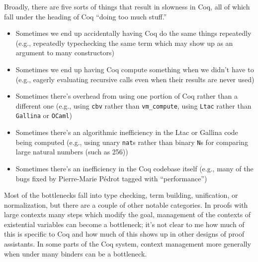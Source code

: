 \documentclass{article}
\begin{document}
Broadly, there are five sorts of things that result in slowness in Coq, all of which fall under the heading of Coq ``doing too much stuff.''
\begin{itemize}
\item
  Sometimes we end up accidentally having Coq do the same things repeatedly (e.g., repeatedly typechecking the same term which may show up as an argument to many constructors)
\item
  Sometimes we end up having Coq compute something when we didn't have to (e.g., eagerly evaluating recursive calls even when their results are never used)
\item
  Sometimes there's overhead from using one portion of Coq rather than a different one (e.g., using \texttt{cbv} rather than \texttt{vm\_compute}, using \texttt{Ltac} rather than \texttt{Gallina} or \texttt{OCaml})
\item
  Sometimes there's an algorithmic inefficiency in the Ltac or Gallina code being computed (e.g., using unary \texttt{nat}s rather than binary \texttt{N}s for comparing large natural numbers (such as 256))
\item
  Sometimes there's an inefficiency in the Coq codebase itself (e.g., many of the bugs fixed by Pierre-Marie P\'edrot tagged with ``performance'')
\end{itemize}

Most of the bottlenecks fall into type checking, term building, unification, or normalization, but there are a couple of other notable categories.
In proofs with large contexts many steps which modify the goal, management of the contexts of existential variables can become a bottleneck; it's not clear to me how much of this is specific to Coq and how much of this shows up in other designs of proof assistants.
In some parts of the Coq system, context management more generally when under many binders can be a bottleneck.
\end{document}
